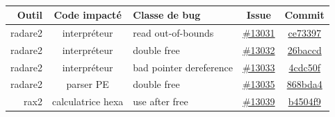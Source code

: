 \paragraph{}
\begin{tabularx}{\textwidth}{|r|c|X|c|c|}
    \hline
    \textbf{Outil} & \textbf{Code impacté} & \textbf{Classe de bug} & \textbf{Issue} & \textbf{Commit} \\
    \hline
    radare2 & interpréteur & read out-of-bounds & \href{https://github.com/radare/radare2/issues/13031}{\#13031} & \href{https://github.com/radare/radare2/commit/ce73397}{ce73397} \\
    \hline
    radare2 & interpréteur & double free & \href{https://github.com/radare/radare2/issues/13032}{\#13032} & \href{https://github.com/radare/radare2/commit/26baccd}{26baccd} \\
    \hline
    radare2 & interpréteur & bad pointer dereference & \href{https://github.com/radare/radare2/issues/13033}{\#13033} & \href{https://github.com/radare/radare2/commit/4cdc50f}{4cdc50f} \\
    \hline
    radare2 & parser PE & double free & \href{https://github.com/radare/radare2/issues/13035}{\#13035} & \href{https://github.com/radare/radare2/commit/868bda4}{868bda4} \\
    \hline
    rax2 & calculatrice hexa & use after free & \href{https://github.com/radare/radare2/issues/13039}{\#13039} & \href{https://github.com/radare/radare2/commit/b4504f9}{b4504f9} \\
    \hline
\end{tabularx}
